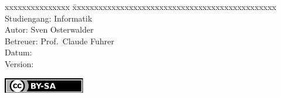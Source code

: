 \begin{titlepage}
\begin{flushleft}
        \fontsize{10pt}{17pt}\selectfont
        \begin{tabbing}
        xxxxxxxxxxxxxxx   \= xxxxxxxxxxxxxxxxxxxxxxxxxxxxxxxxxxxxxxxxxxxxxxx \kill
        Studiengang:      \> Informatik                                         \\
        Autor:            \> Sven Osterwalder\protect\footnotemark[1]{}         \\
        Betreuer:         \> Prof.~Claude Fuhrer\protect\footnotemark[2]{} \\
        Datum:            \> \vhCurrentDate{}\\
        Version:          \> \vhCurrentVersion\\
        \end{tabbing}
    \end{flushleft}

    \vfill
    \includegraphics[height=\baselineskip]{img/by-sa}\\ \small{}

    \thispagestyle{titlepageStyle}

\end{titlepage}
